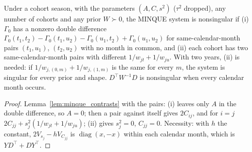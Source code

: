 \begin{theorem}\label{thm:Factor_season_nonsingular}
  \leanok
  Under a cohort season, with the parameters $(A, C, s^2)$ ($\tau^2$ dropped), any number of cohorts
  and any prior $W \succ 0$, the MINQUE system is nonsingular if (i) $\Gamma_0$ has a nonzero
  double difference $\Gamma_0(t_1,t_2) - \Gamma_0(t_1,u_2) - \Gamma_0(u_1,t_2) + \Gamma_0(u_1,u_2)$
  for same-calendar-month pairs $(t_1, u_1)$, $(t_2, u_2)$ with no month in common, and (ii) each
  cohort has two same-calendar-month pairs with different $1/w_{jt} + 1/w_{ju}$. With two years,
  (ii) is needed: if $1/w_{j,(0,m)} + 1/w_{j,(1,m)}$ is the same for every $m$, the system is
  singular for every prior and shape. $D^\top W^{-1}D$ is nonsingular when every calendar month
  occurs.
\end{theorem}
\begin{proof}
  \leanok
  Lemma~\ref{lem:minque_contrasts} with the pairs: (i) leaves only $A$ in the double
  difference, so $A = 0$; then a pair against itself gives $2C_{ij}$, and for $i = j$
  $2C_{jj} + s_j^2(1/w_{jt} + 1/w_{ju})$; (ii) gives $s_j^2 = 0$, $C_{jj} = 0$. Necessity: with
  $h$ the constant, $2V_{s_j} - hV_{C_{jj}}$ is $\operatorname{diag}(x, -x)$ within each calendar
  month, which is $YD^\top + DY^\top$.
\end{proof}

